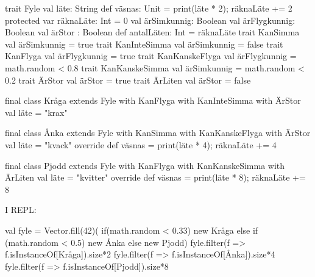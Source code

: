 \begin{Code}
trait Fyle {
  val läte: String
  def väsnas: Unit = { print(läte * 2); räknaLäte += 2 }
  protected var räknaLäte: Int = 0
  val ärSimkunnig: Boolean
  val ärFlygkunnig: Boolean
  val ärStor : Boolean
  def antalLäten: Int = räknaLäte
}
trait KanSimma { val ärSimkunnig = true }
trait KanInteSimma { val ärSimkunnig = false }
trait KanFlyga { val ärFlygkunnig = true }
trait KanKanskeFlyga { val ärFlygkunnig = math.random < 0.8 }
trait KanKanskeSimma { val ärSimkunnig = math.random < 0.2 }
trait ÄrStor { val ärStor = true }
trait ÄrLiten { val ärStor = false }

final class Kråga
  extends Fyle
  with KanFlyga
  with KanInteSimma
  with ÄrStor{
  val läte = "krax"
}

final class Ånka
  extends Fyle
  with KanSimma
  with KanKanskeFlyga
  with ÄrStor{
  val läte = "kvack"
  override def väsnas = { print(läte * 4); räknaLäte += 4 }
}

final class Pjodd
  extends Fyle
  with KanFlyga
  with KanKanskeSimma
  with ÄrLiten{
  val läte = "kvitter"
  override def väsnas = { print(läte * 8); räknaLäte += 8 }
}
\end{Code}

I REPL:
\begin{REPL}
val fyle = Vector.fill(42)(
  if(math.random < 0.33) new Kråga else
  if (math.random < 0.5) new Ånka else
  new Pjodd)
fyle.filter(f => f.isInstanceOf[Kråga]).size*2
fyle.filter(f => f.isInstanceOf[Ånka]).size*4
fyle.filter(f => f.isInstanceOf[Pjodd]).size*8
\end{REPL}

\AdvancedTasks %
